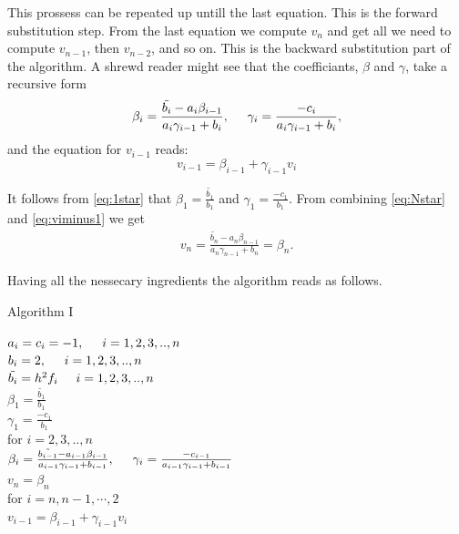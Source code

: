 \documentclass[11pt,a4paper,english,draft]{article}
\numberwithin{equation}{section}
\begin{document}
This prossess can be repeated up untill the last equation. 
This is the forward substitution step. 
From the last equation we compute $v_n$ and get all we need to compute $v_{n-1}$,
then $v_{n-2}$, and so on. This is the backward substitution part of the algorithm. A shrewd reader might see that the coefficiants, $\beta$ and $\gamma$, take a recursive form
\begin{align*}
\beta_{i} = \frac{\tilde{b_i}-a_i \beta_{i-1}}{a_i \gamma_{i-1} + b_i} , \hspace{0.5cm} \gamma_{i}=\frac{-c_i}{a_i \gamma_{i-1} + b_i},
\end{align*}
and the equation for $v_{i-1}$ reads: 
\begin{equation}
v_{i-1} = \beta_{i-1} + \gamma_{i-1} v_i
\label{eq:viminus1}
\end{equation}

It follows from \eqref{eq:1star} that $\beta_1 = \frac{\tilde{b_1}}{b_1}$ and $\gamma_1 = \frac{-c_1}{b_1}$.
From combining \eqref{eq:Nstar} and \eqref{eq:viminus1} we get 
\begin{align*}
v_n = \frac{\tilde{b_n}-a_n \beta_{n-1}}{a_n \gamma_{n-1} + b_n} = \beta_{n}.
\end{align*}

Having all the nessecary ingredients the algorithm reads as follows.
\vspace{0.5cm}

\centerline{Algorithm I}
\begin{tcolorbox}
$a_i = c_i = -1, \hspace{0.5cm}  i=1,2,3,..,n$\\
$b_i = 2, \hspace{0.5cm}  i=1,2,3,..,n $\\
$\tilde{b_i} = h^2 f_i \hspace{0.5cm}  i=1,2,3,..,n $\\
$\beta_1 = \frac{\tilde{b_1}}{b_1}$ \\
$\gamma_1 = \frac{-c_1}{b_1}$ \\
for $i=2,3,..,n$ \\ \vspace{0.5cm} 
 \hspace{0.5cm} $ \beta_{i} = \frac{\tilde{b_{i-1}}-a_{i-1} \beta_{i-1}}{a_{i-1} \gamma_{i-1} + b_{i-1}} , \hspace{0.5cm} \gamma_{i}=\frac{-c_{i-1}}{a_{i-1} \gamma_{i-1} + b_{i-1}} $ \vspace{0.2cm}  \\
 $v_{n} = \beta_{n}$\\
for $i=n, n-1, \cdots ,2$\\ \vspace{0.5cm} 
 \hspace{0.5cm} $v_{i-1} = \beta_{i-1} + \gamma_{i-1} v_i$
\end{tcolorbox} 
\end{document}
